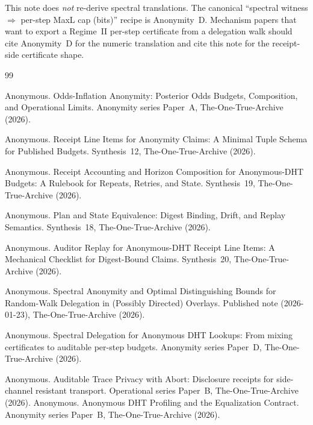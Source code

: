 \documentclass[11pt]{article}
\begin{document}
This note does \emph{not} re-derive spectral translations.
The canonical ``spectral witness $\Rightarrow$ per-step MaxL cap (bits)'' recipe is Anonymity~D.\cite{series:spectral2budget}
Mechanism papers that want to export a Regime~II per-step certificate from a delegation walk should cite Anonymity~D for the numeric translation and cite this note for the receipt-side certificate shape.

\begin{thebibliography}{99}\small

Anonymous.
\newblock Odds-Inflation Anonymity: Posterior Odds Budgets, Composition, and Operational Limits.
\newblock Anonymity series Paper~A, The-One-True-Archive (2026).

Anonymous.
\newblock Receipt Line Items for Anonymity Claims: A Minimal Tuple Schema for Published Budgets.
\newblock Synthesis~12, The-One-True-Archive (2026).

Anonymous.
\newblock Receipt Accounting and Horizon Composition for Anonymous-DHT Budgets: A Rulebook for Repeats, Retries, and State.
\newblock Synthesis~19, The-One-True-Archive (2026).

Anonymous.
\newblock Plan and State Equivalence: Digest Binding, Drift, and Replay Semantics.
\newblock Synthesis~18, The-One-True-Archive (2026).

Anonymous.
\newblock Auditor Replay for Anonymous-DHT Receipt Line Items: A Mechanical Checklist for Digest-Bound Claims.
\newblock Synthesis~20, The-One-True-Archive (2026).

Anonymous.
\newblock Spectral Anonymity and Optimal Distinguishing Bounds for Random-Walk Delegation in (Possibly Directed) Overlays.
\newblock Published note (2026-01-23), The-One-True-Archive (2026).

Anonymous.
\newblock Spectral Delegation for Anonymous DHT Lookups: From mixing certificates to auditable per-step budgets.
\newblock Anonymity series Paper~D, The-One-True-Archive (2026).

Anonymous.
\newblock Auditable Trace Privacy with Abort: Disclosure receipts for side-channel resistant transport.
\newblock Operational series Paper~B, The-One-True-Archive (2026).
Anonymous.
\newblock Anonymous DHT Profiling and the Equalization Contract.
\newblock Anonymity series Paper~B, The-One-True-Archive (2026).
\end{thebibliography}
\end{document}
